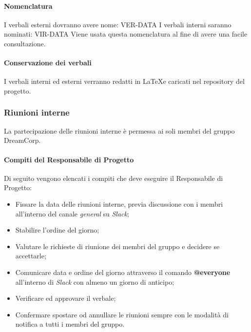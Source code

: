                     \paragraph{Nomenclatura} 
                        I verbali esterni dovranno avere nome:
                        VER-DATA
                        \newline
                        I verbali interni saranno nominati:
                        VIR-DATA
                        \newline
                        Viene usata questa nomenclatura al fine di avere una facile consultazione.
                        \newline
                    \paragraph{Conservazione dei verbali}
                        I verbali interni ed esterni verranno redatti in \LaTeX e caricati nel repository del progetto.
                \subsubsection{Riunioni interne}
                    La partecipazione delle riunioni interne è permessa ai soli membri del gruppo DreamCorp.
                    \newline
                    \paragraph{Compiti del Responsabile di Progetto}
                        Di seguito vengono elencati i compiti che deve eseguire il Responsabile di Progetto:
                        \begin{itemize}
                            \item Fissare la data delle riunioni interne, previa discussione con i membri all'interno del canale \textit{general} su \textit{Slack};
                            \item Stabilire l'ordine del giorno;
                            \item Valutare le richieste di riunione dei membri del gruppo e decidere se accettarle;
                            \item Comunicare data e ordine del giorno attraverso il comando \textbf{@everyone} all'interno di \textit{Slack} con almeno un giorno di anticipo;
                            \item Verificare ed approvare il verbale;
                            \item Confermare spostare od annullare le riunioni sempre con le modalità di notifica a tutti i membri del gruppo.
                         \end{itemize}
